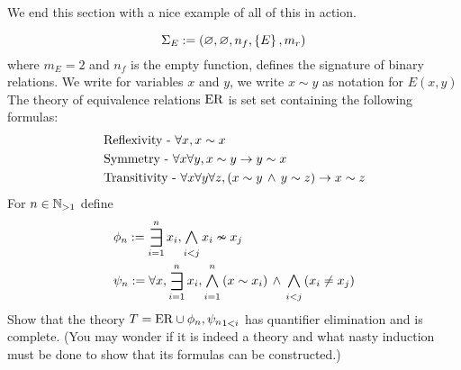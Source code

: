 We end this section with a nice example of all of this in action.
\begin{eg}
    \[\Sigma_E := (\varnothing,\varnothing,n_f,\left\{E\right\},m_r)\]
    where $m_E = 2$ and $n_f$ is the empty function, 
    defines the signature of binary relations.
    We write for variables $x$ and $y$, 
    we write $x \sim y$ as notation for $E(x,y)$
    The theory of equivalence relations $\mathrm{ER}$ 
    is set set containing the following formulas:
    \begin{align*}
        &\text{Reflexivity - } \forall x, x \sim x\\
        &\text{Symmetry - } \forall x \forall y, x \sim y \to y \sim x\\
        &\text{Transitivity - } 
        \forall x \forall y \forall z, (x \sim y \, \land \, y \sim z) \to x \sim z
    \end{align*}
    For $n \in \mathbb{N}_{>1}$ define 
    \begin{align*}
        &\phi_n := \bigexists{i = 1}{n} x_i, \bigand{i < j}{} x_i \nsim x_j\\
        &\psi_n := \forall x, \bigexists{i = 1}{n} x_i, 
            \bigand{i = 1}{n} \brkt{x \sim x_i} \AND 
            \bigand{i < j}{} \brkt{x_i \ne x_j}
    \end{align*}
    Show that the theory $T = \mathrm{ER} \cup {\phi_n, \psi_n}_{1 < i}$ has 
    quantifier elimination and is complete.
    (You may wonder if it is indeed a theory
    and what nasty induction must be done to 
    show that its formulas can be constructed.)
\end{eg}
